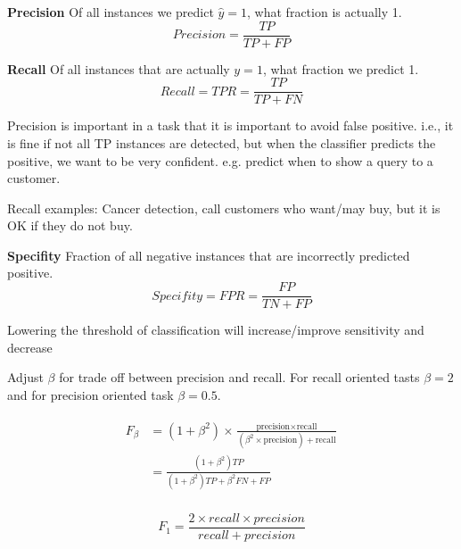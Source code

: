 \begin{deff}{}
\textbf{Precision} Of all instances we predict $\hat y = 1$,
what fraction is actually 1.
\begin{equation}\label{eq:precision}
Precision =  \frac{TP}{TP + FP}
\end{equation}
\end{deff}

\begin{deff}{}
\textbf{Recall} Of all instances that are actually $y = 1$,
what fraction we predict 1.
\begin{equation}\label{eq:recall}
Recall =  TPR = \frac{TP}{TP + FN}
\end{equation}
\end{deff}

Precision is important in a task that it is important
to avoid false positive. i.e., it is fine if not all TP instances are detected,
but when the classifier predicts the positive, we want to be very confident.
e.g. predict when to show a query to a customer.

Recall examples: Cancer detection, call customers who want/may
buy, but it is OK if they do not buy.

\begin{deff}{}
\textbf{Specifity} Fraction of all negative instances that 
are incorrectly predicted positive.
\begin{equation}\label{eq:specifity}
Specifity = FPR = \frac{FP}{TN + FP}
\end{equation}
\end{deff}
 Lowering the threshold of classification
 will increase/improve sensitivity and decrease
 

\begin{deff}{}
Adjust $\beta$ for trade off between  precision and recall.
For recall oriented tasts $\beta = 2$ and for precision oriented task $\beta = 0.5$.

\begin{gather} \label{eq:Fscore}%
\begin{aligned} 
F_\beta &= (1+\beta^2) \times \frac{\text{precision} \times \text{recall}}{(\beta^2 \times \text{precision}) + \text{recall}}\\
             &= \frac{(1+\beta^2) TP}{ (1+\beta^2) TP + \beta^2 FN + FP}\\ 
\end{aligned} 
\end{gather} %

\begin{equation}\label{eq:F1score}
F_1 = \frac{2 \times recall \times precision}{ recall + precision}
\end{equation}
\end{deff}


